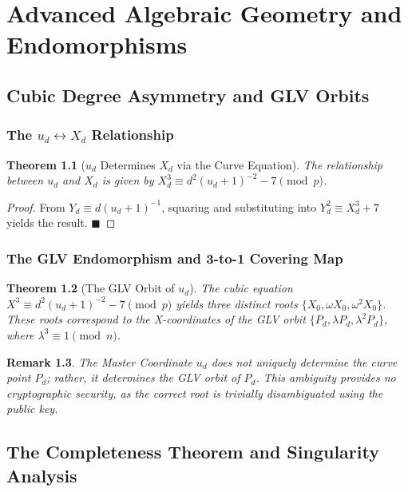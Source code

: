 \documentclass[11pt, a4paper, twoside]{book}
\newtheorem{theorem}{Theorem}[chapter]
\newtheorem{remark}[theorem]{Remark}
\begin{document}
\part{Advanced Algebraic Geometry and Endomorphisms}

\chapter{Cubic Degree Asymmetry and GLV Orbits}

\section{The $u_d \leftrightarrow X_d$ Relationship}
\begin{theorem}[$u_d$ Determines $X_d$ via the Curve Equation]
The relationship between $u_d$ and $X_d$ is given by $X_d^3 \equiv d^2 (u_d + 1)^{-2} - 7 \pmod p$.
\end{theorem}
\begin{proof}
From $Y_d \equiv d(u_d + 1)^{-1}$, squaring and substituting into $Y_d^2 \equiv X_d^3 + 7$ yields the result. $\blacksquare$
\end{proof}

\section{The GLV Endomorphism and 3-to-1 Covering Map}
\begin{theorem}[The GLV Orbit of $u_d$]
The cubic equation $X^3 \equiv d^2(u_d+1)^{-2} - 7 \pmod p$ yields three distinct roots $\{X_0, \omega X_0, \omega^2 X_0\}$. These roots correspond to the X-coordinates of the GLV orbit $\{P_d, \lambda P_d, \lambda^2 P_d\}$, where $\lambda^3 \equiv 1 \pmod n$.
\end{theorem}
\begin{remark}
The Master Coordinate $u_d$ does not uniquely determine the curve point $P_d$; rather, it determines the \textit{GLV orbit} of $P_d$. This ambiguity provides no cryptographic security, as the correct root is trivially disambiguated using the public key.
\end{remark}

\chapter{The Completeness Theorem and Singularity Analysis}
\end{document}
